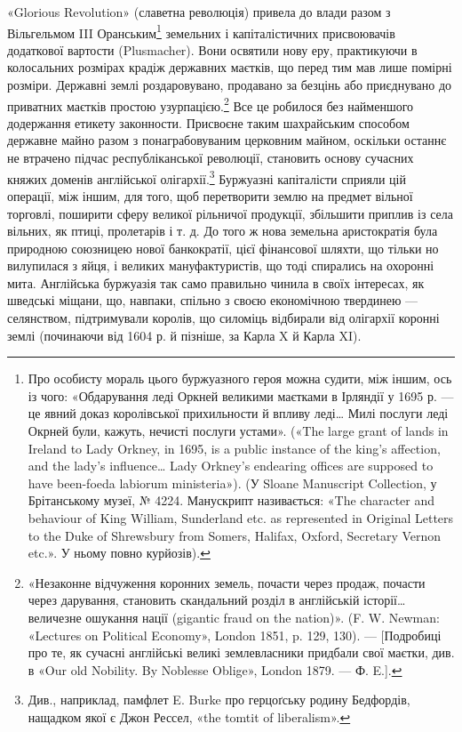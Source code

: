 «Glorious Revolution» (славетна революція) привела до влади
разом з Вільгельмом III Оранським\footnote{
Про особисту мораль цього буржуазного героя можна судити,
між іншим, ось із чого: «Обдарування леді Оркней великими маєтками
в Ірляндії у 1695 р. — це явний доказ королівської прихильности й впливу
леді\dots{} Милі послуги леді Окрней були, кажуть, нечисті послуги устами».
(«The large grant of lands in Ireland to Lady Orkney, in 1695, is a public
instance of the king’s affection, and the lady’s influence\dots{} Lady Orkney’s
endearing offices are supposed to have been-foeda labiorum ministeria»).
(У Sloane Manuscript Collection, у Брітанському музеї, № 4224.
Манускрипт називається: «The character and behaviour of King William,
Sunderland etc. as represented in Original Letters to the Duke of
Shrewsbury from Somers, Halifax, Oxford, Secretary Vernon etc.». У ньому
повно курйозів).
} земельних і капіталістичних
присвоювачів додаткової вартости (Plusmacher). Вони освятили
нову еру, практикуючи в колосальних розмірах крадіж
державних маєтків, що перед тим мав лише помірні розміри.
Державні землі роздаровувано, продавано за безцінь або приєднувано
до приватних маєтків простою узурпацією.\footnote{
«Незаконне відчуження коронних земель, почасти через продаж,
почасти через дарування, становить скандальний розділ в англійській
історії\dots{} величезне ошукання нації (gigantic fraud on the nation)».
(F. W. Newman: «Lectures on Political Economy», London 1851, p. 129,
130). — [Подробиці про те, як сучасні англійські великі землевласники
придбали свої маєтки, див. в «Our old Nobility. By Noblesse Oblige», London
1879. — Ф. E.].
} Все це
робилося без найменшого додержання етикету законности. Присвоєне
таким шахрайським способом державне майно разом з
понаграбовуваним церковним майном, оскільки останнє не втрачено
підчас республіканської революції, становить основу сучасних
княжих доменів англійської олігархії.\footnote{
Див., наприклад, памфлет E. Burke про герцоґську родину
Бедфордів, нащадком якої є Джон Рессел, «the tomtit of liberalism».
} Буржуазні
капіталісти сприяли цій операції, між іншим, для того, щоб
перетворити землю на предмет вільної торговлі, поширити сферу
великої рільничої продукції, збільшити приплив із села вільних,
як птиці, пролетарів і т. д. До того ж нова земельна аристократія
була природною союзницею нової банкократії, цієї фінансової
шляхти, що тільки но вилупилася з яйця, і великих мануфактуристів,
що тоді спирались на охоронні мита. Англійська буржуазія
так само правильно чинила в своїх інтересах, як шведські
міщани, що, навпаки, спільно з своєю економічною твердинею
— селянством, підтримували королів, що силоміць відбирали
від олігархії коронні землі (починаючи від 1604 р. й
пізніше, за Карла X й Карла XI).

